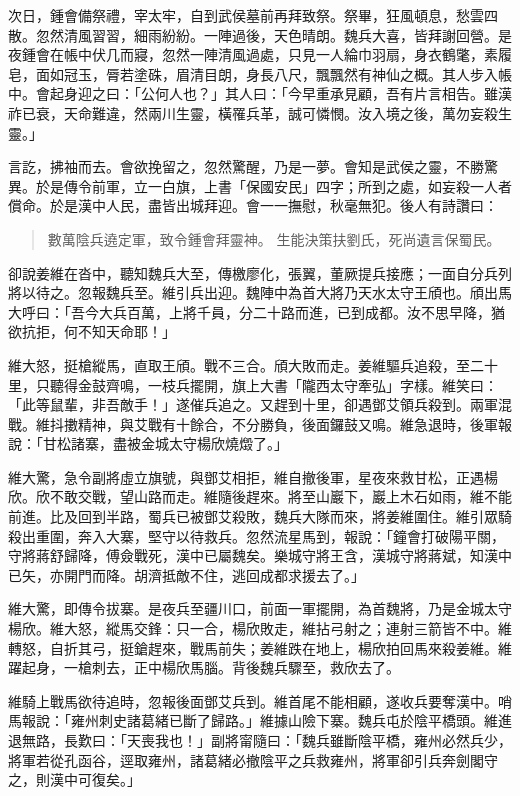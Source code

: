 次日，鍾會備祭禮，宰太牢，自到武侯墓前再拜致祭。祭畢，狂風頓息，愁雲四散。忽然清風習習，細雨紛紛。一陣過後，天色晴朗。魏兵大喜，皆拜謝回營。是夜鍾會在帳中伏几而寢，忽然一陣清風過處，只見一人綸巾羽扇，身衣鶴氅，素履皂，面如冠玉，脣若塗硃，眉清目朗，身長八尺，飄飄然有神仙之概。其人步入帳中。會起身迎之曰：「公何人也？」其人曰：「今早重承見顧，吾有片言相告。雖漢祚已衰，天命難違，然兩川生靈，橫罹兵革，誠可憐憫。汝入境之後，萬勿妄殺生靈。」

言訖，拂袖而去。會欲挽留之，忽然驚醒，乃是一夢。會知是武侯之靈，不勝驚異。於是傳令前軍，立一白旗，上書「保國安民」四字；所到之處，如妄殺一人者償命。於是漢中人民，盡皆出城拜迎。會一一撫慰，秋毫無犯。後人有詩讚曰：

\begin{quote}
數萬陰兵遶定軍，致令鍾會拜靈神。
生能決策扶劉氏，死尚遺言保蜀民。
\end{quote}

卻說姜維在沓中，聽知魏兵大至，傳檄廖化，張翼，董厥提兵接應；一面自分兵列將以待之。忽報魏兵至。維引兵出迎。魏陣中為首大將乃天水太守王頎也。頎出馬大呼曰：「吾今大兵百萬，上將千員，分二十路而進，已到成都。汝不思早降，猶欲抗拒，何不知天命耶！」

維大怒，挺槍縱馬，直取王頎。戰不三合。頎大敗而走。姜維驅兵追殺，至二十里，只聽得金鼓齊鳴，一枝兵擺開，旗上大書「隴西太守牽弘」字樣。維笑曰：「此等鼠輩，非吾敵手！」遂催兵追之。又趕到十里，卻遇鄧艾領兵殺到。兩軍混戰。維抖擻精神，與艾戰有十餘合，不分勝負，後面鑼鼓又鳴。維急退時，後軍報說：「甘松諸寨，盡被金城太守楊欣燒燬了。」

維大驚，急令副將虛立旗號，與鄧艾相拒，維自撤後軍，星夜來救甘松，正遇楊欣。欣不敢交戰，望山路而走。維隨後趕來。將至山巖下，巖上木石如雨，維不能前進。比及回到半路，蜀兵已被鄧艾殺敗，魏兵大隊而來，將姜維圍住。維引眾騎殺出重圍，奔入大寨，堅守以待救兵。忽然流星馬到，報說：「鐘會打破陽平關，守將蔣舒歸降，傅僉戰死，漢中已屬魏矣。樂城守將王含，漢城守將蔣斌，知漢中已矢，亦開門而降。胡濟抵敵不住，逃回成都求援去了。」

維大驚，即傳令拔寨。是夜兵至疆川口，前面一軍擺開，為首魏將，乃是金城太守楊欣。維大怒，縱馬交鋒：只一合，楊欣敗走，維拈弓射之；連射三箭皆不中。維轉怒，自折其弓，挺鎗趕來，戰馬前失；姜維跌在地上，楊欣拍回馬來殺姜維。維躍起身，一槍刺去，正中楊欣馬腦。背後魏兵驟至，救欣去了。

維騎上戰馬欲待追時，忽報後面鄧艾兵到。維首尾不能相顧，遂收兵要奪漢中。哨馬報說：「雍州刺史諸葛緒已斷了歸路。」維據山險下寨。魏兵屯於陰平橋頭。維進退無路，長歎曰：「天喪我也！」副將甯隨曰：「魏兵雖斷陰平橋，雍州必然兵少，將軍若從孔函谷，逕取雍州，諸葛緒必撤陰平之兵救雍州，將軍卻引兵奔劍閣守之，則漢中可復矣。」

